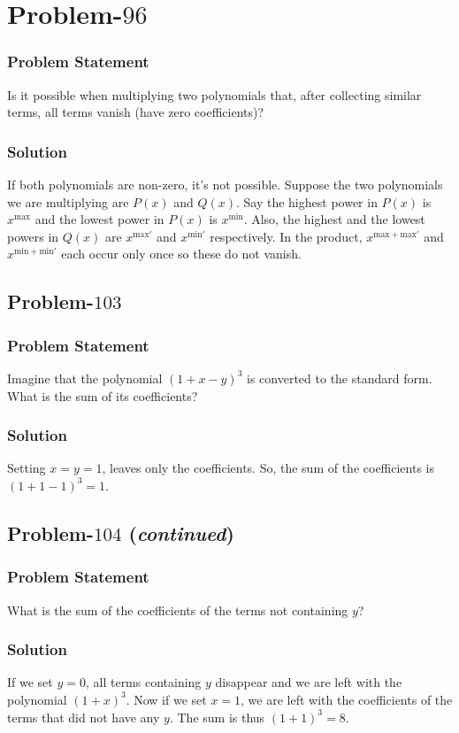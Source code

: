 \documentclass[12pt]{article}
\begin{document}
\section*{Problem-$96$}
\subsubsection*{Problem Statement}
Is it possible when multiplying two polynomials that, after collecting similar terms, all terms vanish (have zero coefficients)?

\subsubsection*{Solution}
If both polynomials are non-zero, it's not possible. Suppose the two polynomials we are multiplying are $P(x)$ and $Q(x)$. Say the highest power in $P(x)$ is $x^\textrm{max}$ and the lowest power in $P(x)$ is $x^\textrm{min}$. Also, the highest and the lowest powers in $Q(x)$ are $x^{\textrm{max}'}$ and $x^{\textrm{min}'}$ respectively. In the product, $x^{\textrm{max}+\textrm{max}'}$ and $x^{\textrm{min}+\textrm{min}'}$ each occur only once so these do not vanish.

\subsection*{Problem-$103$}
\subsubsection*{Problem Statement}
Imagine that the polynomial $(1+x-y)^3$ is converted to the standard form. What is the sum of its coefficients?
\subsubsection*{Solution}
Setting $x=y=1$, leaves only the coefficients. So, the sum of the coefficients is $(1+1-1)^3 = 1$.

\subsection*{Problem-$104$ (\emph{continued})}
\subsubsection*{Problem Statement}
What is the sum of the coefficients of the terms not containing $y$?
\subsubsection*{Solution}
If we set $y=0$, all terms containing $y$ disappear and we are left with the polynomial $(1+x)^3$. Now if we set $x=1$, we are left with the coefficients of the terms that did not have any $y$. The sum is thus $(1+1)^3 = 8$.
\end{document}
